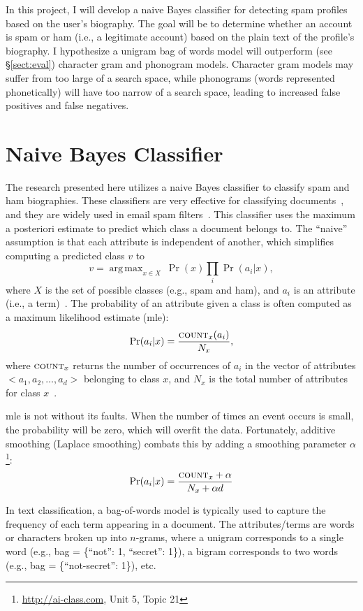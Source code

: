\documentclass[10pt]{article}
\DeclareMathOperator*{\argmax}{arg\,max}
\begin{document}
In this project, I will develop a naive Bayes classifier for detecting spam
profiles based on the user's biography. The goal will be to determine whether an
account is spam or ham (i.e., a legitimate account) based on the plain text of
the profile's biography. I hypothesize a unigram bag of words model will outperform (see
\S\ref{sect:eval}) character gram and phonogram models. Character gram models
may suffer from too large of a search space, while phonograms (words
represented phonetically) will have too narrow of a search space, leading to
increased false positives and false negatives.

\section{Naive Bayes Classifier}
The research presented here utilizes a naive Bayes classifier to classify spam
and ham biographies. These classifiers are very effective for classifying
documents~\cite[p182]{mitchell}, and they are widely used in email spam
filters~\cite{which-nb}. This classifier uses the maximum a posteriori
estimate to predict which class a document belongs to. The ``naive''
assumption is that each attribute is independent of another, which simplifies
computing a predicted class $v$ to
\[ v = \argmax_{x\in X}\ \Pr(x)\prod_i{\Pr(a_i|x)}, \]
where $X$ is the set of possible classes (e.g., spam and ham), and $a_i$ is an
attribute (i.e., a term)~\cite[p177]{mitchell}. The probability of an attribute given a class is
often computed as a maximum likelihood estimate ({\sc mle}):
\[ \Pr(a_i|x) = \frac{{\textsc{count}_x}(a_i)}{N_x}, \] where
$\textsc{count}_x$ returns the number of occurrences of $a_i$ in the vector of
attributes $<a_1, a_2, \ldots, a_d>$ belonging to class $x$, and $N_x$ is the total number of attributes
for class $x$~\cite[p177]{mitchell}.

{\sc mle} is not without its faults. When the number of times an event occurs
is small, the probability will be zero, which will overfit the data.
Fortunately, additive smoothing (Laplace smoothing) combats this by adding a
smoothing parameter $\alpha$\footnote{\url{http://ai-class.com}, Unit 5, Topic 21}:
\[ \Pr(a_i|x) = \frac{{\textsc{count}}_x + \alpha}{N_x + \alpha d} \]

In text classification, a bag-of-words model is typically used to capture the
frequency of each term appearing in a document. The attributes/terms are words
or characters broken up into $n$-grams, where a unigram corresponds to a
single word (e.g., bag = \{``not'': 1, ``secret'': 1\}), a bigram corresponds to two
words (e.g., bag = \{``not-secret'': 1\}), etc.
\end{document}
